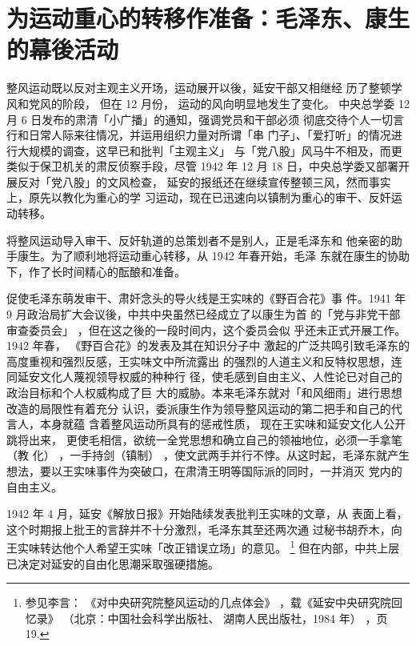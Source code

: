 \section{为运动重心的转移作准备：毛泽东、康生的幕後活动}
整风运动既以反对主观主义开场，运动展开以後，延安干部又相继经
历了整顿学风和党风的阶段，
但在 12 月份，
运动的风向明显地发生了变化。
中央总学委 12 月 6 日发布的肃清「小广播」的通知，强调党员和干部必须
彻底交待个人一切言行和日常人际来往情况，并运用组织力量对所谓「串
门子」、「爱打听」的情况进行大规模的调查，这早已和批判「主观主义」
与「党八股」风马牛不相及，而更类似于保卫机关的肃反侦察手段，尽管
1942 年 12 月 18 日，中央总学委又部署开展反对「党八股」的文风检查，
延安的报纸还在继续宣传整顿三风，然而事实上，原先以教化为重心的学
习运动，现在已迅速向以镇制为重心的审干、反奸运动转移。

将整风运动导入审干、反奸轨道的总策划者不是别人，正是毛泽东和
他亲密的助手康生。为了顺利地将运动重心转移，从 1942 年春开始，毛泽
东就在康生的协助下，作了长时间精心的酝酿和准备。

促使毛泽东萌发审干、肃奸念头的导火线是王实味的《野百合花》事
件。1941 年 9 月政治局扩大会议後，中共中央虽然已经成立了以康生为首
的「党与非党干部审查委员会」
，但在这之後的一段时间内，这个委员会似
乎还未正式开展工作。1942 年春，
《野百合花》的发表及其在知识分子中
激起的广泛共鸣引致毛泽东的高度重视和强烈反感，王实味文中所流露出
的强烈的人道主义和反特权思想，连同延安文化人蔑视领导权威的种种行
径，使毛感到自由主义、人性论已对自己的政治目标和个人权威构成了巨
大的威胁。本来毛泽东就对「和风细雨」进行思想改造的局限性有着充分
认识，委派康生作为领导整风运动的第二把手和自己的代言人，本身就蕴
含着整风运动所具有的惩戒性质，
现在王实味和延安文化人公开跳将出来，
更使毛相信，欲统一全党思想和确立自己的领袖地位，必须一手拿笔（教
化）
，一手持剑（镇制）
，使文武两手并行不悖。从这时起，毛泽东就产生
想法，要以王实味事件为突破口，在肃清王明等国际派的同时，一并消灭
党内的自由主义。

1942 年 4 月，延安《解放日报》开始陆续发表批判王实味的文章，从
表面上看，这个时期报上批王的言辞并不十分激烈，毛泽东其至还两次通
过秘书胡乔木，向王实味转达他个人希望王实味「改正错误立场」的意见。
\footnote{参见李言：
《对中央研究院整风运动的几点体会》
，载《延安中央研究院回忆录》
（北京：中国社会科学出版社、
湖南人民出版社，1984 年）
，页 19.}
但在内部，中共上层已决定对延安的自由化思潮采取强硬措施。

